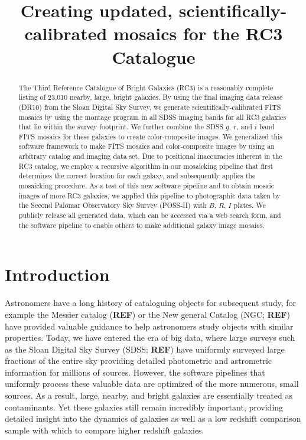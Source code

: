 \documentclass[authoryear, 12pt,5p, times]{elsarticle}
\begin{document}
\begin{frontmatter}
\title{Creating updated, scientifically-calibrated mosaics for the RC3 Catalogue}
	\begin{abstract}

The Third Reference Catalogue of Bright Galaxies (RC3) is a reasonably complete listing of 23,010 nearby, large, bright galaxies. By using the final imaging data release (DR10) from the Sloan Digital Sky Survey, we generate scientifically-calibrated FITS mosaics by using the montage program in all SDSS imaging bands for all RC3 galaxies that lie within the survey footprint. We further combine the SDSS $g$, $r$, and $i$ band FITS mosaics for these galaxies to create color-composite images. We generalized this software framework to make FITS mosaics and color-composite images by using an arbitrary catalog and imaging data set. Due to positional inaccuracies inherent in the RC3 catalog, we employ a recursive algorithm in our mosaicking pipeline that first determines the correct location for each galaxy, and subsequently applies the mosaicking procedure. As a test of this new software pipeline and to obtain mosaic images of more RC3 galaxies, we applied this pipeline to  photographic data taken by the Second Palomar Observatory Sky Survey (POSS-II) with $B$, $R$, $I$ plates. We publicly release all generated data, which can be accessed via a web search form, and the software pipeline to enable others to make additional galaxy image mosaics.
	\end{abstract}
\end{frontmatter}
\section{Introduction}

Astronomers have a long history of cataloguing objects for subsequent study, for example the Messier catalog (\textbf{REF}) or the New general Catalog (NGC; \textbf{REF}) have provided valuable guidance to help astronomers study objects with similar properties. Today, we have entered the era of big data, where large surveys such as the Sloan Digital Sky Survey (SDSS; \textbf{REF}) have uniformly surveyed large fractions of the entire sky providing detailed photometric and astrometric information for millions of sources. However, the software pipelines that uniformly process these valuable data are optimized of the more numerous, small sources. As a result, large, nearby, and bright galaxies are essentially treated as contaminants. Yet these galaxies still remain incredibly important, providing detailed insight into the dynamics of galaxies as well as a low redshift comparison sample with which to compare higher redshift galaxies. 
\end{document}

